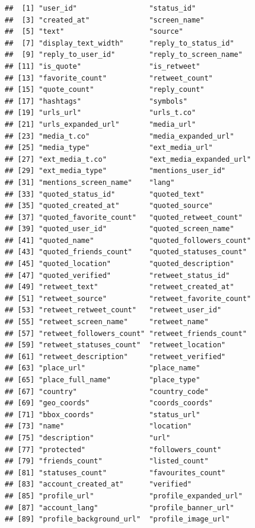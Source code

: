 \documentclass[
]{article}
\begin{document}
\begin{verbatim}
##  [1] "user_id"                 "status_id"              
##  [3] "created_at"              "screen_name"            
##  [5] "text"                    "source"                 
##  [7] "display_text_width"      "reply_to_status_id"     
##  [9] "reply_to_user_id"        "reply_to_screen_name"   
## [11] "is_quote"                "is_retweet"             
## [13] "favorite_count"          "retweet_count"          
## [15] "quote_count"             "reply_count"            
## [17] "hashtags"                "symbols"                
## [19] "urls_url"                "urls_t.co"              
## [21] "urls_expanded_url"       "media_url"              
## [23] "media_t.co"              "media_expanded_url"     
## [25] "media_type"              "ext_media_url"          
## [27] "ext_media_t.co"          "ext_media_expanded_url" 
## [29] "ext_media_type"          "mentions_user_id"       
## [31] "mentions_screen_name"    "lang"                   
## [33] "quoted_status_id"        "quoted_text"            
## [35] "quoted_created_at"       "quoted_source"          
## [37] "quoted_favorite_count"   "quoted_retweet_count"   
## [39] "quoted_user_id"          "quoted_screen_name"     
## [41] "quoted_name"             "quoted_followers_count" 
## [43] "quoted_friends_count"    "quoted_statuses_count"  
## [45] "quoted_location"         "quoted_description"     
## [47] "quoted_verified"         "retweet_status_id"      
## [49] "retweet_text"            "retweet_created_at"     
## [51] "retweet_source"          "retweet_favorite_count" 
## [53] "retweet_retweet_count"   "retweet_user_id"        
## [55] "retweet_screen_name"     "retweet_name"           
## [57] "retweet_followers_count" "retweet_friends_count"  
## [59] "retweet_statuses_count"  "retweet_location"       
## [61] "retweet_description"     "retweet_verified"       
## [63] "place_url"               "place_name"             
## [65] "place_full_name"         "place_type"             
## [67] "country"                 "country_code"           
## [69] "geo_coords"              "coords_coords"          
## [71] "bbox_coords"             "status_url"             
## [73] "name"                    "location"               
## [75] "description"             "url"                    
## [77] "protected"               "followers_count"        
## [79] "friends_count"           "listed_count"           
## [81] "statuses_count"          "favourites_count"       
## [83] "account_created_at"      "verified"               
## [85] "profile_url"             "profile_expanded_url"   
## [87] "account_lang"            "profile_banner_url"     
## [89] "profile_background_url"  "profile_image_url"
\end{verbatim}
\end{document}
